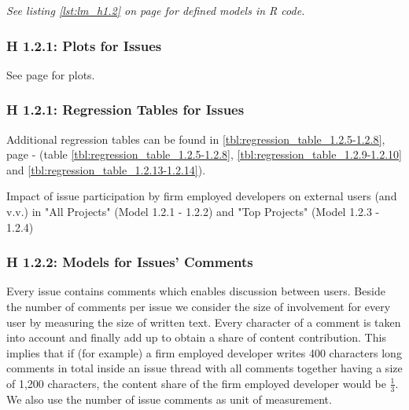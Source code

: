 \textit{See listing \ref{lst:lm_h1.2} on page \pageref{lst:lm_h1.2} for defined models in R code.}

\subsubsection{H 1.2.1: Plots for Issues}

See page \pageref{sec:h_1.2.1_plots} for plots.

\subsubsection{H 1.2.1: Regression Tables for Issues}

Additional regression tables can be found in \ref{tbl:regression_table_1.2.5-1.2.8}, page \pageref{tbl:regression_table_1.2.5-1.2.8} -  \pageref{tbl:regression_table_1.2.13-1.2.14} (table \ref{tbl:regression_table_1.2.5-1.2.8}, \ref{tbl:regression_table_1.2.9-1.2.10} and \ref{tbl:regression_table_1.2.13-1.2.14}).

\begin{table}[!h] \centering
  \scriptsize{
	  
  }
	\caption{Impact of issue participation by firm employed developers on external users (and v.v.) in "All Projects" (Model 1.2.1 - 1.2.2) and "Top Projects" (Model 1.2.3 - 1.2.4)}
  \label{tbl:regression_table_1.2.1-1.2.4}
\end{table}

\clearpage
\subsubsection{H 1.2.2: Models for Issues' Comments}
\label{sec:h1.2.2_models}

Every issue contains comments which enables discussion between users. Beside the number of comments per issue we consider the size of involvement for every user by measuring the size of written text. Every character of a comment is taken into account and finally add up to obtain a share of content contribution. This implies that if (for example) a firm employed developer writes 400 characters long comments in total inside an issue thread with all comments together having a size of 1,200 characters, the content share of the firm employed developer would be $\frac{1}{3}$. We also use the number of issue comments as unit of measurement.

